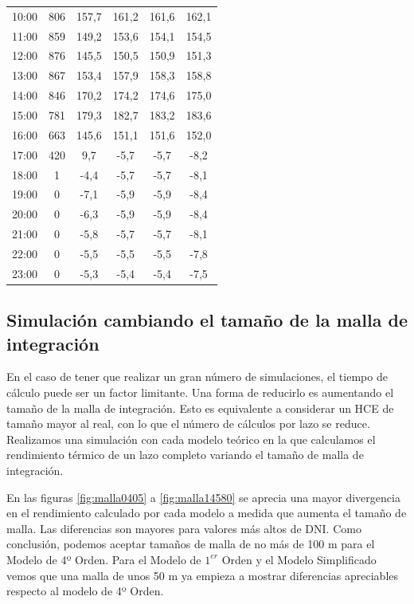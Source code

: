 \begin{longtable}[c]{cccccc}
10:00 & 806 & 157,7 & 161,2 & 161,6 & 162,1 \\
11:00 & 859 & 149,2 & 153,6 & 154,1 & 154,5 \\
12:00 & 876 & 145,5 & 150,5 & 150,9 & 151,3 \\
13:00 & 867 & 153,4 & 157,9 & 158,3 & 158,8 \\
14:00 & 846 & 170,2 & 174,2 & 174,6 & 175,0 \\
15:00 & 781 & 179,3 & 182,7 & 183,2 & 183,6 \\
16:00 & 663 & 145,6 & 151,1 & 151,6 & 152,0 \\
17:00 & 420 & 9,7   & -5,7  & -5,7  & -8,2  \\
18:00 & 1   & -4,4  & -5,7  & -5,7  & -8,1  \\
19:00 & 0   & -7,1  & -5,9  & -5,9  & -8,4  \\
20:00 & 0   & -6,3  & -5,9  & -5,9  & -8,4  \\
21:00 & 0   & -5,8  & -5,7  & -5,7  & -8,1  \\
22:00 & 0   & -5,5  & -5,5  & -5,5  & -7,8  \\
23:00 & 0   & -5,3  & -5,4  & -5,4  & -7,5 
\end{longtable}


\subsection{Simulación cambiando el tamaño de la malla de integración}
\label{mallaintegracion}

En el caso de tener que realizar un gran número de simulaciones, el tiempo de cálculo puede ser un factor limitante. Una forma de reducirlo es aumentando el tamaño de la malla de integración. Esto es equivalente a considerar un HCE de tamaño mayor al real, con lo que el número de cálculos por lazo se reduce. Realizamos una simulación con cada modelo teórico en la que calculamos el rendimiento térmico de un lazo completo variando el tamaño de malla de integración.  

En las figuras  \ref{fig:malla0405} a \ref{fig:malla14580} se aprecia una mayor divergencia en el rendimiento calculado por cada modelo a medida que aumenta el tamaño de malla. Las diferencias son mayores para valores más altos de DNI. Como conclusión, podemos aceptar tamaños de malla de no más de 100 m para el Modelo de 4º Orden. Para el Modelo de $1^{er}$ Orden y el Modelo Simplificado vemos que una malla de unos 50 m ya empieza a mostrar diferencias apreciables respecto al modelo de 4º Orden.

